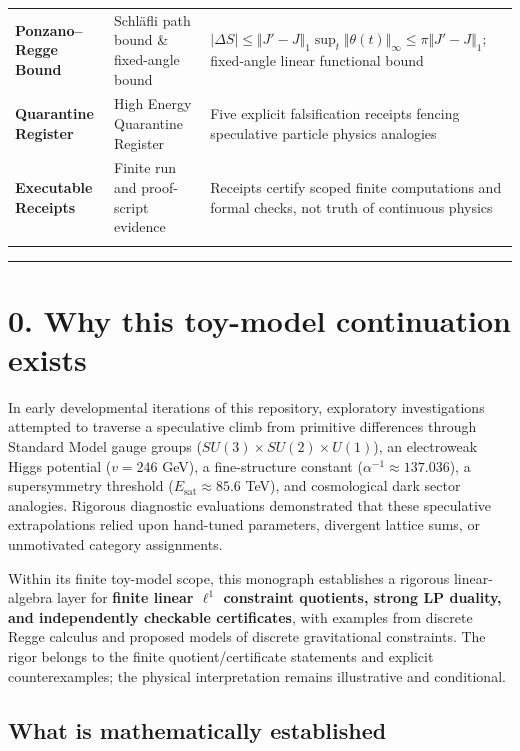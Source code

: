 \documentclass[11pt]{article}
\begin{document}
\begin{small}
\begin{longtable}{>{\raggedright\arraybackslash}p{}>{\raggedright\arraybackslash}p{}>{\raggedright\arraybackslash}p{}}
\addlinespace[0.25em]
\textbf{Ponzano--Regge Bound} & Schläfli path bound \& fixed-angle bound & $\lvert \Delta S \rvert \le \Vert J' - J \Vert_1 \sup_t \Vert \theta(t) \Vert_\infty \le \pi \Vert J' - J \Vert_1$; fixed-angle linear functional bound \\
\addlinespace[0.25em]
\textbf{Quarantine Register} & High Energy Quarantine Register & Five explicit falsification receipts fencing speculative particle physics analogies \\
\addlinespace[0.25em]
\textbf{Executable Receipts} & Finite run and proof-script evidence & Receipts certify scoped finite computations and formal checks, not truth of continuous physics \\
\addlinespace[0.25em]
\bottomrule
\end{longtable}
\end{small}

\medskip\hrule\medskip
\section{\texorpdfstring{0. Why this toy-model continuation exists}{0. Why this toy-model continuation exists}}

In early developmental iterations of this repository, exploratory investigations attempted to traverse a speculative climb from primitive differences through Standard Model gauge groups ($SU(3) \times SU(2) \times U(1)$), an electroweak Higgs potential ($v = 246$ GeV), a fine-structure constant ($\alpha^{-1} \approx 137.036$), a supersymmetry threshold ($E_{\mathrm{sat}} \approx 85.6$ TeV), and cosmological dark sector analogies. Rigorous diagnostic evaluations demonstrated that these speculative extrapolations relied upon hand-tuned parameters, divergent lattice sums, or unmotivated category assignments.

Within its finite toy-model scope, this monograph establishes a rigorous linear-algebra layer for \textbf{finite linear $\ell^1$ constraint quotients, strong LP duality, and independently checkable certificates}, with examples from discrete Regge calculus and proposed models of discrete gravitational constraints. The rigor belongs to the finite quotient/certificate statements and explicit counterexamples; the physical interpretation remains illustrative and conditional.

\subsection{\texorpdfstring{What is mathematically established}{What is mathematically established}}
\end{document}
